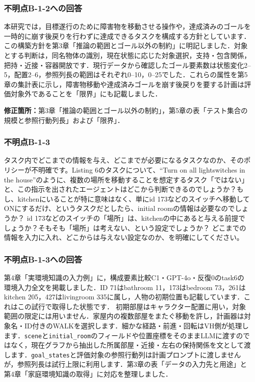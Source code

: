 \documentclass{jsarticle}
\begin{document}
\subsubsection*{不明点B-1-2への回答}
本研究では，目標遂行のために障害物を移動させる操作や，達成済みのゴールを一時的に崩す後戻りを行わずに達成できるタスクを構成する方針としています．この構築方針を第3章「推論の範囲とゴール以外の制約」に明記しました．対象とする判断は，同名物体の識別，現在状態に応じた対象選択，支持・包含関係，把持・近接・容器開放です．現行データから確認したゴール要素数は状態変化2--5，配置2--6，参照列長の範囲はそれぞれ0--10，0--25でした．これらの属性を第5章の集計表に示し，障害物移動や達成済みゴールを崩す後戻りを要する計画は評価対象外であることを「限界」にも記載しました．

\noindent\textbf{修正箇所：}第3章「推論の範囲とゴール以外の制約」，第5章の表「テスト集合の規模と参照行動列長」および「限界」．



\subsubsection*{不明点B-1-3}
\begin{screen}
タスク内でどこまでの情報を与え、どこまでが必要になるタスクなのか、そのポリシーが不明確です。Listing 6のタスクについて、``Turn on all lightswitches in the house''のように、複数の場所を移動することを想定するタスク「ではない」と、この指示を出されたエージェントはどこから判断できるのでしょうか？もし、kitchenにいることが特に意味はなく、単にid 173などのスイッチへ移動してONにするだけ、というタスクだとしたら、initial roomの情報は必要なのでしょうか？ id 173などのスイッチの「場所」は、kitchenの中にあると与える前提でしょうか？そもそも「場所」は考えない、という設定でしょうか？ どこまでの情報を入力に入れ、どこからは与えない設定なのか、を明確にしてください。
\end{screen}


\subsubsection*{不明点B-1-3への回答}
第4章「実環境知識の入力例」に，構成要素比較C1・GPT-4o・反復0のtask6の環境入力全文を掲載しました．ID 71はbathroom 11，173はbedroom 73，261はkitchen 205，427はlivingroom 335に属し，人物の初期位置も記載しています．これはこの試行で取得した状態です．
初期部屋はキャラクター配置に用い，対象範囲の限定には用いません．家屋内の複数部屋をまたぐ移動を許し，計画器は対象名・ID付きのWALKを選択します．細かな経路・前進・回転はVH側が処理します．\texttt{scene}と\texttt{initial\_room}のフィールドや位置座標をそのままLLMに渡すのではなく，現在グラフから抽出した所属部屋・近接・左右の保持関係を文として渡します．\texttt{goal\_states}と評価対象の参照行動列は計画プロンプトに渡しませんが，参照列長は試行上限に利用します．第3章の表「データの入力先と用途」と第4章「家庭環境知識の取得」に対応を整理しました．
\end{document}
